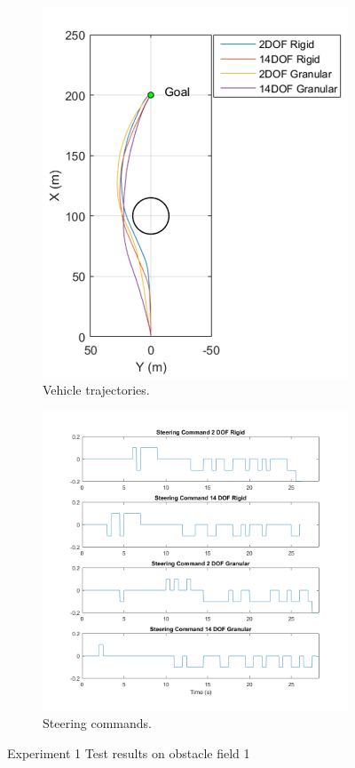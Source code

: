\documentclass[12pt,onecolumn]{report}
\begin{document}
\begin{figure}
	\centering
	\begin{subfigure}[b]{0.49\columnwidth}
		\centering
		\includegraphics[height=\columnwidth]{Figs/ObstacleField1Trajectories.png}
		\caption{{\small Vehicle trajectories.}}   
		\label{fig:ObstacleField1Trajectories}
	\end{subfigure}
	\hfill
	\begin{subfigure}[b]{0.49\columnwidth}
		\centering
		\includegraphics[width=\columnwidth]{Figs/SteeringCommandsField1.png}
		\caption{\small Steering commands.}   
		\label{fig:SteeringCommandsField1}
	\end{subfigure}
	\caption{\small Experiment 1 Test results on obstacle field 1}
	\label{fig:Obst1TestData}
\end{figure}
\end{document}
